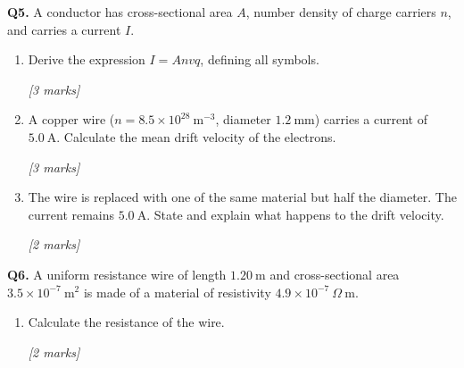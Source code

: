 \begin{tcolorbox}[colback=white, colframe=midblue, breakable]

\begin{minipage}{\linewidth}
\textbf{Q5.} A conductor has cross-sectional area $A$, number density of charge carriers $n$, and carries a current $I$.
\end{minipage}

\begin{enumerate}[label=(\alph*)]
  \item \begin{minipage}[t]{\linewidth}
  Derive the expression $I = Anvq$, defining all symbols.
  \par\hfill\textit{[3 marks]}
  \vspace{4cm}
  \end{minipage}

  \item \begin{minipage}[t]{\linewidth}
  A copper wire ($n = 8.5\times10^{28}\ \text{m}^{-3}$, diameter $1.2\ \text{mm}$) carries a current of $5.0\ \text{A}$. Calculate the mean drift velocity of the electrons.
  \par\hfill\textit{[3 marks]}
  \vspace{3.5cm}
  \end{minipage}

  \item \begin{minipage}[t]{\linewidth}
  The wire is replaced with one of the same material but half the diameter. The current remains $5.0\ \text{A}$. State and explain what happens to the drift velocity.
  \par\hfill\textit{[2 marks]}
  \vspace{3cm}
  \end{minipage}
\end{enumerate}

\begin{minipage}{\linewidth}
\textbf{Q6.} A uniform resistance wire of length $1.20\ \text{m}$ and cross-sectional area $3.5\times10^{-7}\ \text{m}^2$ is made of a material of resistivity $4.9\times10^{-7}\ \Omega\ \text{m}$.

\begin{enumerate}[label=(\alph*)]
  \item Calculate the resistance of the wire.
  \par\hfill\textit{[2 marks]}
  \vspace{3cm}


\end{enumerate}
\end{minipage}
\end{tcolorbox}
